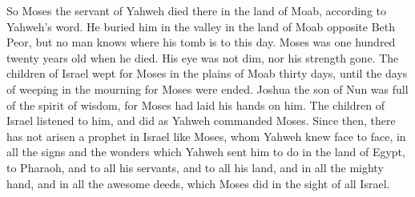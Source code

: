  So Moses the servant of Yahweh died there in the land of
Moab, according to Yahweh's word.  He buried him in the
valley in the land of Moab opposite Beth Peor, but no man knows where
his tomb is to this day.  Moses was one hundred twenty
years old when he died. His eye was not dim, nor his strength gone.
 The children of Israel wept for Moses in the plains of
Moab thirty days, until the days of weeping in the mourning for Moses
were ended.  Joshua the son of Nun was full of the spirit
of wisdom, for Moses had laid his hands on him. The children of Israel
listened to him, and did as Yahweh commanded Moses. 
Since then, there has not arisen a prophet in Israel like Moses, whom
Yahweh knew face to face,  in all the signs and the
wonders which Yahweh sent him to do in the land of Egypt, to Pharaoh,
and to all his servants, and to all his land,  and in all
the mighty hand, and in all the awesome deeds, which Moses did in the
sight of all Israel.
